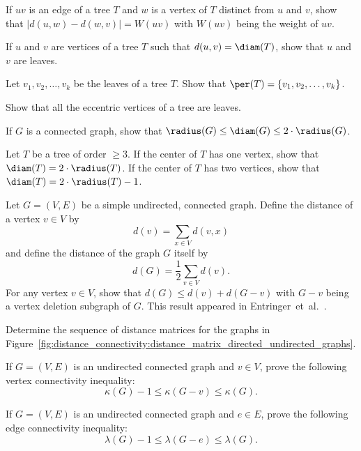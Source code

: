 \begin{problem}
\item If $uv$ is an edge of a tree $T$ and $w$ is a vertex of $T$
  distinct from $u$ and $v$, show that $|d(u,w) - d(w,v)| = W(uv)$
  with $W(uv)$ being the weight of $uv$.

\item If $u$ and $v$ are vertices of a tree $T$ such that
  $d(u,v) = \diam(T)$, show that $u$ and $v$ are leaves.

\item Let $v_1, v_2, \dots, v_k$ be the leaves of a tree $T$. Show
  that $\per(T) = \{v_1, v_2, \dots, v_k\}$.

\item\label{prob:distance_connectivity:eccentric_vertices_laves} Show
  that all the eccentric vertices of a tree are leaves.

\item If $G$ is a connected graph, show that
  $\radius(G) \leq \diam(G) \leq 2 \cdot \radius(G)$.

\item Let $T$ be a tree of order $\geq 3$. If the center of $T$ has
  one vertex, show that $\diam(T) = 2 \cdot \radius(T)$. If the center
  of $T$ has two vertices, show that
  $\diam(T) = 2 \cdot \radius(T) - 1$.

\item Let $G = (V,E)$ be a simple undirected, connected graph. Define
  the distance of a vertex $v \in V$ by
  \[
  d(v)
  =
  \sum_{x \in V} d(v,x)
  \]
  and define the distance of the graph $G$ itself by
  \[
  d(G)
  =
  \frac{1}{2} \sum_{v \in V} d(v).
  \]
  For any vertex $v \in V$, show that
  $d(G) \leq d(v) + d(G - v)$ with $G - v$ being a vertex deletion
  subgraph of $G$. This result appeared in
  Entringer~et~al.~\cite[p.284]{EntringerEtAl1976}.

\item Determine the sequence of distance matrices for the graphs in
  Figure~\ref{fig:distance_connectivity:distance_matrix_directed_undirected_graphs}.

\item If $G = (V,E)$ is an undirected connected graph and $v \in V$,
  prove the following vertex connectivity inequality:
  \[
  \kappa(G) - 1
  \leq
  \kappa(G - v)
  \leq
  \kappa(G).
  \]

\item If $G = (V,E)$ is an undirected connected graph and $e \in E$,
  prove the following edge connectivity inequality:
  \[
  \lambda(G) - 1
  \leq
  \lambda(G - e)
  \leq
  \lambda(G).
  \]


\end{problem}
